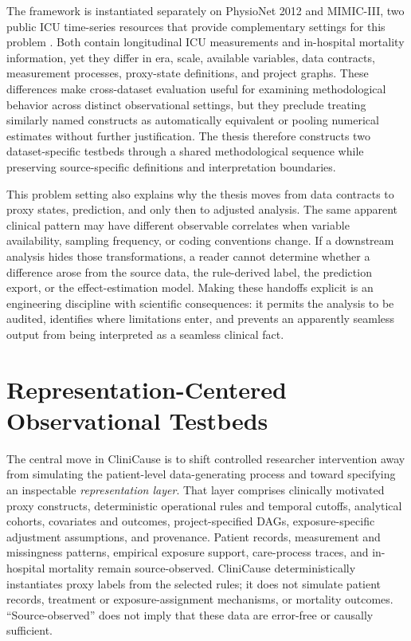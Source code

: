 The framework is instantiated separately on PhysioNet 2012 and MIMIC-III, two public ICU time-series resources that provide complementary settings for this problem \cite{silva2012physionet,johnson2016mimiciii}.  Both contain longitudinal ICU measurements and in-hospital mortality information, yet they differ in era, scale, available variables, data contracts, measurement processes, proxy-state definitions, and project graphs.  These differences make cross-dataset evaluation useful for examining methodological behavior across distinct observational settings, but they preclude treating similarly named constructs as automatically equivalent or pooling numerical estimates without further justification.  The thesis therefore constructs two dataset-specific testbeds through a shared methodological sequence while preserving source-specific definitions and interpretation boundaries.

This problem setting also explains why the thesis moves from data contracts to proxy states, prediction, and only then to adjusted analysis.  The same apparent clinical pattern may have different observable correlates when variable availability, sampling frequency, or coding conventions change.  If a downstream analysis hides those transformations, a reader cannot determine whether a difference arose from the source data, the rule-derived label, the prediction export, or the effect-estimation model.  Making these handoffs explicit is an engineering discipline with scientific consequences: it permits the analysis to be audited, identifies where limitations enter, and prevents an apparently seamless output from being interpreted as a seamless clinical fact.

\section{Representation-Centered Observational Testbeds}
\label{sec:introduction:representation-centered-observational-testbeds}

The central move in CliniCause is to shift controlled researcher intervention away from simulating the patient-level data-generating process and toward specifying an inspectable \emph{representation layer}.  That layer comprises clinically motivated proxy constructs, deterministic operational rules and temporal cutoffs, analytical cohorts, covariates and outcomes, project-specified DAGs, exposure-specific adjustment assumptions, and provenance.  Patient records, measurement and missingness patterns, empirical exposure support, care-process traces, and in-hospital mortality remain source-observed.  CliniCause deterministically instantiates proxy labels from the selected rules; it does not simulate patient records, treatment or exposure-assignment mechanisms, or mortality outcomes.  ``Source-observed'' does not imply that these data are error-free or causally sufficient.


